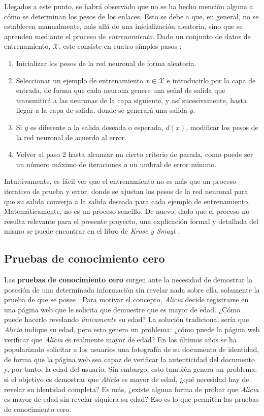 \documentclass[a4paper, 11pt]{article}
\begin{document}
Llegados a este punto, se habrá observado que no se ha hecho mención alguna a cómo se determinan los
pesos de los enlaces. Esto se debe a que, en general, no se establecen manualmente, más allá de una
inicialización aleatoria, sino que se aprenden mediante el proceso de \textit{entrenamiento}. Dado
un conjunto de datos de entrenamiento, $\mathcal{X}$, este consiste en cuatro simples pasos
\cite[Capítulo~3]{krose1996introduction}:
\begin{enumerate}
  \item Inicializar los pesos de la red neuronal de forma aleatoria.
  \item Seleccionar un ejemplo de entrenamiento $x \in \mathcal{X}$ e introducirlo por la capa de
        entrada, de forma que cada neurona genere una señal de salida que transmitirá a las neuronas
        de la capa siguiente, y así sucesivamente, hasta llegar a la capa de salida, donde se
        generará una salida $y$.
  \item Si $y$ es diferente a la salida deseada o esperada, $d(x)$, modificar los pesos de la red
        neuronal de acuerdo al error.
  \item Volver al paso 2 hasta alcanzar un cierto criterio de parada, como puede ser un número máximo
        de iteraciones o un umbral de error mínimo.
\end{enumerate}
Intuitivamente, es fácil ver que el entrenamiento no es más que un proceso iterativo de prueba y
error, donde se ajustan los pesos de la red neuronal para que su salida converja a la salida deseada
para cada ejemplo de entrenamiento. Matemáticamente, no es un proceso sencillo. De nuevo, dado que el
proceso no resulta relevante para el presente proyecto, una explicación formal y detallada del mismo
se puede encontrar en el libro de \textit{Krose y Smagt} \cite[Capítulo~4]{krose1996introduction}.

\subsection{Pruebas de conocimiento cero} \label{zk}

Las \textbf{pruebas de conocimiento cero} surgen ante la necesidad de demostrar la posesión de una
determinada información sin revelar nada sobre ella, solamente la prueba de que se posee
\cite[Capítulo~4]{goldreich2001foundations}. Para motivar el concepto, \textit{Alicia} decide
registrarse en una página web que le solicita que demuestre que es mayor de edad. ¿Cómo puede hacerlo
revelando \textit{únicamente} su edad? La solución tradicional sería que \textit{Alicia} indique su
edad, pero esto genera un problema: ¿cómo puede la página web verificar que \textit{Alicia} es
realmente mayor de edad? En los últimos años se ha popularizado solicitar a los usuarios una
fotografía de su documento de identidad, de forma que la página web sea capaz de verificar la
autenticidad del documento y, por tanto, la edad del usuario. Sin embargo, esto también genera un
problema: si el objetivo es demostrar que \textit{Alicia} es mayor de edad, ¿qué necesidad hay de
revelar su identidad completa? Es más, ¿existe alguna forma de probar que \textit{Alicia} es mayor de
edad sin revelar siquiera su edad? Eso es lo que permiten las pruebas de conocimiento cero.
\end{document}
